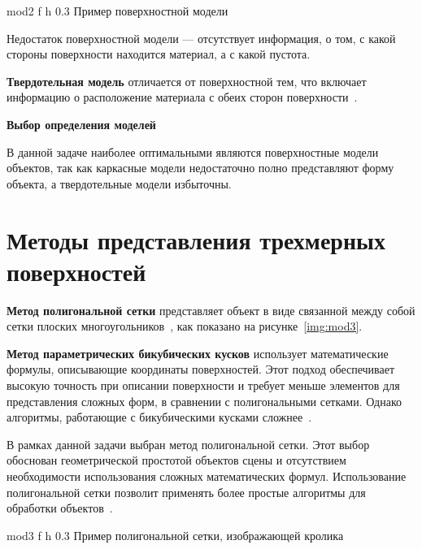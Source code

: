 	{mod2} %
	{f} %
	{h} %
	{0.3\textwidth} %
	{Пример поверхностной модели} %


Недостаток поверхностной модели --- отсутствует информация, о том, с какой стороны поверхности находится материал, а с какой пустота.

\textbf{Твердотельная модель} отличается от поверхностной тем, что включает информацию о расположение материала с обеих сторон поверхности~\cite{model_geom_01}.

\textbf{Выбор определения моделей} 

В данной задаче наиболее оптимальными являются поверхностные модели объектов, так как каркасные модели недостаточно полно представляют форму объекта, а твердотельные модели избыточны.


\section{Методы представления трехмерных поверхностей}

\textbf{Метод полигональной сетки} представляет объект в виде связанной между собой сетки плоских многоугольников~\cite{model_geom}, как показано на рисунке~\ref{img:mod3}.

\textbf{Метод параметрических бикубических кусков} использует математические формулы, описывающие координаты поверхностей.
Этот подход обеспечивает высокую точность при описании поверхности и требует меньше элементов для представления сложных форм, в сравнении с полигональными сетками.
Однако алгоритмы, работающие с бикубическими кусками сложнее~\cite{model_geom}.

В рамках данной задачи выбран метод полигональной сетки.
Этот выбор обоснован геометрической простотой объектов сцены и отсутствием необходимости использования сложных математических формул.
Использование полигональной сетки позволит применять более простые алгоритмы для обработки объектов~\cite{model_geom}.

	{mod3} %
	{f} %
	{h} %
	{0.3\textwidth} %
	{Пример полигональной сетки, изображающей кролика} %


